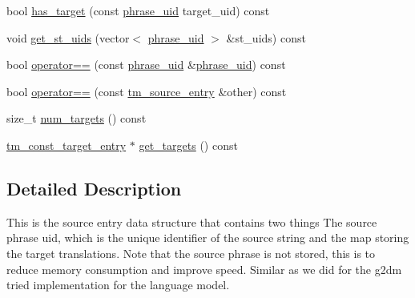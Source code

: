 \begin{DoxyCompactItemize}
\item 
bool \hyperlink{classuva_1_1smt_1_1bpbd_1_1server_1_1tm_1_1models_1_1tm__source__entry_af925b6e80ec88b3784bfd4b3971a8c3c}{has\+\_\+target} (const \hyperlink{namespaceuva_1_1smt_1_1bpbd_1_1server_ad18d4cdf5504e76c22b0c124ff60b44f}{phrase\+\_\+uid} target\+\_\+uid) const 
\item 
void \hyperlink{classuva_1_1smt_1_1bpbd_1_1server_1_1tm_1_1models_1_1tm__source__entry_a4a5576d63e82ad041cabcafa43b8b05e}{get\+\_\+st\+\_\+uids} (vector$<$ \hyperlink{namespaceuva_1_1smt_1_1bpbd_1_1server_ad18d4cdf5504e76c22b0c124ff60b44f}{phrase\+\_\+uid} $>$ \&st\+\_\+uids) const 
\item 
bool \hyperlink{classuva_1_1smt_1_1bpbd_1_1server_1_1tm_1_1models_1_1tm__source__entry_a3766d5c745e57da5e1e8bc99499fd182}{operator==} (const \hyperlink{namespaceuva_1_1smt_1_1bpbd_1_1server_ad18d4cdf5504e76c22b0c124ff60b44f}{phrase\+\_\+uid} \&\hyperlink{namespaceuva_1_1smt_1_1bpbd_1_1server_ad18d4cdf5504e76c22b0c124ff60b44f}{phrase\+\_\+uid}) const 
\item 
bool \hyperlink{classuva_1_1smt_1_1bpbd_1_1server_1_1tm_1_1models_1_1tm__source__entry_a98904c9803bb2e2c74575acf7612443d}{operator==} (const \hyperlink{classuva_1_1smt_1_1bpbd_1_1server_1_1tm_1_1models_1_1tm__source__entry}{tm\+\_\+source\+\_\+entry} \&other) const 
\item 
size\+\_\+t \hyperlink{classuva_1_1smt_1_1bpbd_1_1server_1_1tm_1_1models_1_1tm__source__entry_aea5362e08c0e2973d37a7a274557c9d3}{num\+\_\+targets} () const 
\item 
\hyperlink{namespaceuva_1_1smt_1_1bpbd_1_1server_1_1tm_1_1models_ae043b2a8672e39fe61239f7f1ece86ab}{tm\+\_\+const\+\_\+target\+\_\+entry} $\ast$ \hyperlink{classuva_1_1smt_1_1bpbd_1_1server_1_1tm_1_1models_1_1tm__source__entry_aea1cde8107adf8d9513f6a936e2b293e}{get\+\_\+targets} () const 
\end{DoxyCompactItemize}


\subsection{Detailed Description}
This is the source entry data structure that contains two things The source phrase uid, which is the unique identifier of the source string and the map storing the target translations. Note that the source phrase is not stored, this is to reduce memory consumption and improve speed. Similar as we did for the g2dm tried implementation for the language model. 

